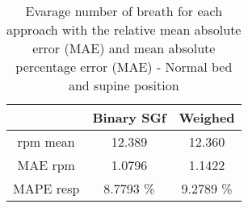 \begin{table}[H]
    \centering
    \begin{tabular}{|c|c|c|}
    \hline 
    & Binary SGf & Weighed  \\ 
    \hline 
    rpm mean & 12.389 & 12.360   \\ 
    MAE rpm & 1.0796 &       1.1422  \\ 
    MAPE resp & 8.7793 \%  & 9.2789 \% \\ 
    \hline 
    \end{tabular}
    
    \caption{Evarage number of breath for each approach with the relative mean
    absolute error (MAE) and mean absolute percentage error (MAE) - Normal bed
    and supine position}
    \label{tab:SupineNormalStillMetricssg}    
\end{table}
    
    